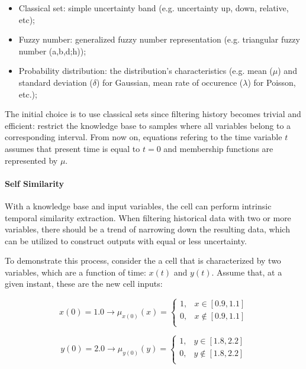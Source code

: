 \begin{itemize}
    \item Classical set: simple uncertainty band (e.g. uncertainty up, down, relative, etc);
    \item Fuzzy number: generalized fuzzy number representation \cite{Zhang2019} (e.g. triangular fuzzy number (a,b,d;h));
    \item Probability distribution: the distribution's characteristics (e.g. mean ($\mu$) and standard deviation ($\delta$) for Gaussian, mean rate of occurence ($\lambda$) for Poisson, etc.);
\end{itemize}

The initial choice is to use classical sets since filtering history becomes trivial and efficient: restrict the knowledge base to samples where all variables belong to a corresponding interval. From now on, equations refering to the time variable $t$ assumes that present time is equal to $t=0$ and membership functions are represented by $\mu$.


\paragraph{Self Similarity}

With a knowledge base and input variables, the cell can perform intrinsic temporal similarity extraction. When filtering historical data with two or more variables, there should be a trend of narrowing down the resulting data, which can be utilized to construct outputs with equal or less uncertainty.

To demonstrate this process, consider the a cell that is characterized by two variables, which are a function of time: $x(t)$ and $y(t)$. 
Assume that, at a given instant, these are the new cell inputs:

\begin{equation}
x(0) = 1.0 \rightarrow \mu_{x(0)}(x) =
\begin{cases}
1, & x \in [0.9, 1.1] \\
0, & x \notin [0.9, 1.1] \\
\end{cases}
\end{equation}

\begin{equation}
y(0) = 2.0 \rightarrow \mu_{y(0)}(y) =
\begin{cases}
1, & y \in [1.8, 2.2] \\
0, & y \notin [1.8, 2.2] \\
\end{cases}
\end{equation}

